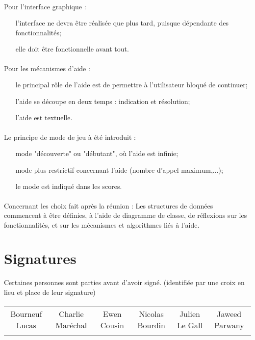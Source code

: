     	\paragraph*{}
	Pour l'interface graphique :
	\begin{itemize}
		\item[l'interface ne devra être réalisée que plus tard, puisque dépendante des fonctionnalités;]
		\item[elle doit être fonctionnelle avant tout.]
	\end{itemize}
    	\paragraph*{}
	Pour les mécanismes d'aide :
	\begin{itemize}
		\item[le principal rôle de l'aide est de permettre à l'utilisateur bloqué de continuer;]
		\item[l'aide se découpe en deux temps : indication et résolution;]
		\item[l'aide est textuelle.]
	\end{itemize}
    	\paragraph*{}
	Le principe de mode de jeu à été introduit :
	\begin{itemize}
		\item[mode "découverte" ou "débutant", où l'aide est infinie;]
		\item[mode plus restrictif concernant l'aide (nombre d'appel maximum,...);]
		\item[le mode est indiqué dans les scores.]
	\end{itemize}

    	\paragraph*{}
	Concernant les choix fait après la réunion :
	Les structures de données commencent à être définies, à l'aide de diagramme de classe, de réflexions sur les fonctionnalités, 
	et sur les mécanismes et algorithmes liés à l'aide.


\section*{Signatures}

    	\paragraph*{}
	Certaines personnes sont parties avant d'avoir signé. (identifiée par une croix en lieu et place de leur signature)
    	\paragraph*{}
    	\begin{tabular*}{0.75\textwidth}{c | c | c | c | c | c}
    	    Bourneuf Lucas & Charlie Maréchal & Ewen Cousin & Nicolas Bourdin & Julien Le Gall & Jaweed Parwany\\
     	     & & & & &
    	\end{tabular*}




